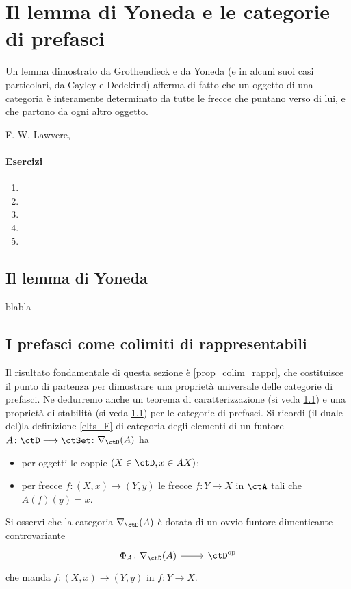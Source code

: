 \chapter{Il lemma di Yoneda e le categorie di prefasci}\label{cap_yoneda}
\epigraph{
Un lemma dimostrato da Grothendieck e da Yoneda (e in alcuni suoi casi particolari, da Cayley e Dedekind) afferma di fatto che un oggetto di una categoria è interamente determinato da tutte le frecce che puntano verso di lui, e che partono da ogni altro oggetto.
}{F. W. Lawvere, \cite{}}
\subsubsection*{Esercizi}
\begin{enumerate}
 \item
 \item
 \item
 \item
 \item
\end{enumerate}


\section{Il lemma di Yoneda}

blabla

\section{I prefasci come colimiti di rappresentabili}\label{sec_colim_rappr}

Il risultato fondamentale di questa sezione è \ref{prop_colim_rappr}, che costituisce il punto di partenza per dimostrare una proprietà universale delle categorie di prefasci. Ne dedurremo anche un teorema di caratterizzazione (si veda \ref{}) e una proprietà di stabilità (si veda \ref{}) per le categorie di prefasci. Si ricordi (il duale del)la definizione \ref{elts_F} di categoria degli elementi di un funtore \(A\colon \ctD \fun \ctSet\): $\Elts\ctD A$ ha
\begin{itemize}
      \item per oggetti le coppie \((X \in \ctD, x \in AX)\);
      \item per frecce \(f \colon (X,x) \to (Y,y)\) le frecce \(f \colon Y \to X\) in \(\ctA\) tali che \(A(f)(y)=x\).
\end{itemize}
Si osservi che la categoria $\Elts\ctD A$ è dotata di un ovvio funtore dimenticante controvariante
 \[\dmFun{\Phi_{A}}{\Elts\ctD A}{\ctD^\op}\]
 che manda $f \colon (X,x) \to (Y,y)$ in $f \colon Y \to X$.

